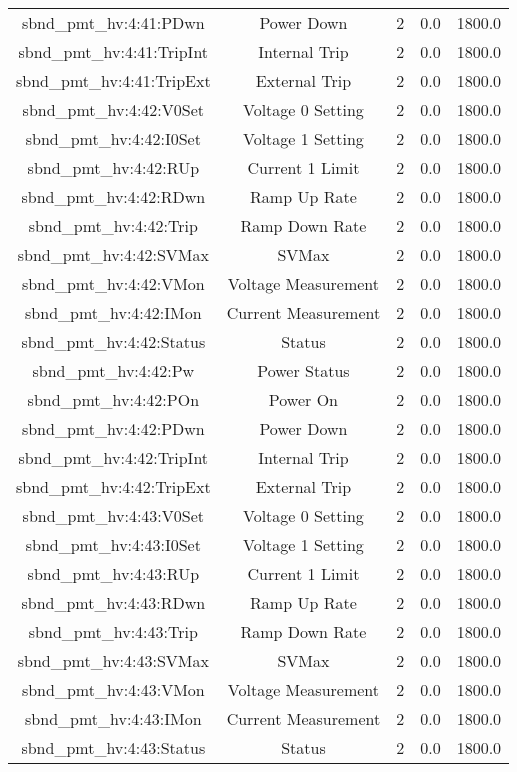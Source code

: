 \begin{table}[ptb]
\begin{tabular}{c | c c c c}
sbnd_pmt_hv:4:41:PDwn & Power Down & 2 & 0.0 & 1800.0\\ 
sbnd_pmt_hv:4:41:TripInt & Internal Trip & 2 & 0.0 & 1800.0\\ 
sbnd_pmt_hv:4:41:TripExt & External Trip & 2 & 0.0 & 1800.0\\ 
sbnd_pmt_hv:4:42:V0Set & Voltage 0 Setting & 2 & 0.0 & 1800.0\\ 
sbnd_pmt_hv:4:42:I0Set & Voltage 1 Setting & 2 & 0.0 & 1800.0\\ 
sbnd_pmt_hv:4:42:RUp & Current 1 Limit & 2 & 0.0 & 1800.0\\ 
sbnd_pmt_hv:4:42:RDwn & Ramp Up Rate & 2 & 0.0 & 1800.0\\ 
sbnd_pmt_hv:4:42:Trip & Ramp Down Rate & 2 & 0.0 & 1800.0\\ 
sbnd_pmt_hv:4:42:SVMax & SVMax & 2 & 0.0 & 1800.0\\ 
sbnd_pmt_hv:4:42:VMon & Voltage Measurement & 2 & 0.0 & 1800.0\\ 
sbnd_pmt_hv:4:42:IMon & Current Measurement & 2 & 0.0 & 1800.0\\ 
sbnd_pmt_hv:4:42:Status & Status & 2 & 0.0 & 1800.0\\ 
sbnd_pmt_hv:4:42:Pw & Power Status & 2 & 0.0 & 1800.0\\ 
sbnd_pmt_hv:4:42:POn & Power On & 2 & 0.0 & 1800.0\\ 
sbnd_pmt_hv:4:42:PDwn & Power Down & 2 & 0.0 & 1800.0\\ 
sbnd_pmt_hv:4:42:TripInt & Internal Trip & 2 & 0.0 & 1800.0\\ 
sbnd_pmt_hv:4:42:TripExt & External Trip & 2 & 0.0 & 1800.0\\ 
sbnd_pmt_hv:4:43:V0Set & Voltage 0 Setting & 2 & 0.0 & 1800.0\\ 
sbnd_pmt_hv:4:43:I0Set & Voltage 1 Setting & 2 & 0.0 & 1800.0\\ 
sbnd_pmt_hv:4:43:RUp & Current 1 Limit & 2 & 0.0 & 1800.0\\ 
sbnd_pmt_hv:4:43:RDwn & Ramp Up Rate & 2 & 0.0 & 1800.0\\ 
sbnd_pmt_hv:4:43:Trip & Ramp Down Rate & 2 & 0.0 & 1800.0\\ 
sbnd_pmt_hv:4:43:SVMax & SVMax & 2 & 0.0 & 1800.0\\ 
sbnd_pmt_hv:4:43:VMon & Voltage Measurement & 2 & 0.0 & 1800.0\\ 
sbnd_pmt_hv:4:43:IMon & Current Measurement & 2 & 0.0 & 1800.0\\ 
sbnd_pmt_hv:4:43:Status & Status & 2 & 0.0 & 1800.0\\ 

\end{tabular}
\end{table}
